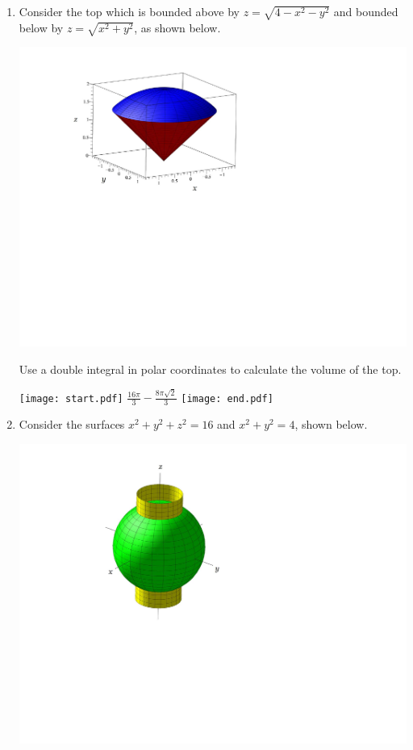\documentclass[12pt]{article}
\begin{document}
\begin{enumerate}
\newpage

\item Consider the top which is bounded above by $z=\sqrt{4-x^2-y^2}$ and bounded below by $z=\sqrt{x^2+y^2}$, as shown below.

\begin{center}
\includegraphics[scale=0.6]{top.pdf}
\end{center}

Use a double integral in polar coordinates to calculate the volume of the top.

\texttt{[image: start.pdf]}
{{$\frac{16\pi}{3}-\frac{8\pi\sqrt{2}}{3}$}}
\texttt{[image: end.pdf]}


\item Consider the surfaces $x^2+y^2+z^2=16$ and $x^2+y^2=4$, shown below.

\begin{center}
\includegraphics[scale=0.5]{earth.pdf}
\end{center}


\end{enumerate}
\end{document}
